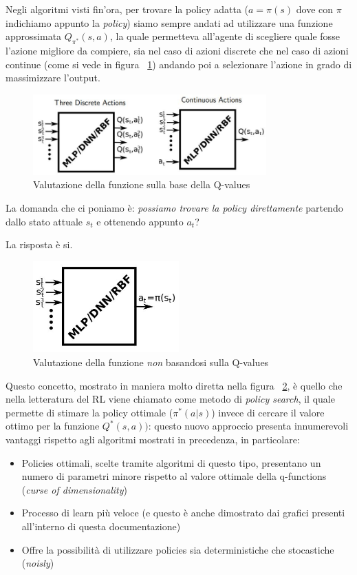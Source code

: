 Negli algoritmi visti fin'ora, per trovare la policy adatta ($a = \pi(s)$ dove con $\pi$ indichiamo appunto la \textit{policy}) siamo sempre andati ad utilizzare una funzione approssimata $Q_{\pi^*}(s,a)$, la quale permetteva all'agente di scegliere quale fosse l'azione migliore da compiere, sia nel caso di azioni discrete che nel caso di azioni continue (come si vede in figura ~\ref{fig:Q_function_utility}) andando poi a selezionare l'azione in grado di massimizzare l'output.

\begin{figure}[!h]
	\centering
	\includegraphics[width=0.8\textwidth]{Immagini/Q_function_utility.JPG}
	\caption{Valutazione della funzione sulla base della Q-values}
	\label{fig:Q_function_utility}
\end{figure}

La domanda che ci poniamo è: \textit{possiamo trovare la policy direttamente} partendo dallo stato attuale $s_t$ e ottenendo appunto $a_t$?

La risposta è si.

\begin{figure}[!h]
	\centering
	\includegraphics[width=0.5\textwidth]{Immagini/No_Q_function.JPG}
	\caption{Valutazione della funzione \textit{non} basandosi sulla Q-values}
	\label{fig:NO_Q_function_utility}
\end{figure}
Questo concetto, mostrato in maniera molto diretta nella figura ~\ref{fig:NO_Q_function_utility}, è quello che nella letteratura del RL viene chiamato come metodo di \textit{policy search}, il quale permette di stimare la policy ottimale ($\pi^*(a|s)$) invece di cercare il valore ottimo per la funzione $Q^*(s,a))$: questo nuovo approccio presenta innumerevoli vantaggi rispetto agli algoritmi mostrati in precedenza, in particolare:
\begin{itemize}
	\item Policies ottimali, scelte tramite algoritmi di questo tipo, presentano un numero di parametri minore rispetto al valore ottimale della q-functions (\textit{curse of dimensionality})
	\item Processo di learn più veloce (e questo è anche dimostrato dai grafici presenti all'interno di questa documentazione)
	\item Offre la possibilità di utilizzare policies sia deterministiche che stocastiche (\textit{noisly})
\end{itemize}


